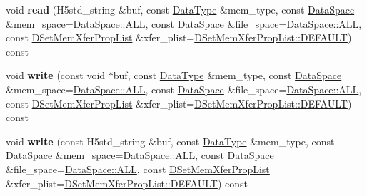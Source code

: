 \begin{DoxyCompactItemize}
\mbox{\label{class_h5_1_1_data_set_aedece6f602299ab2ebc9cbe1a905db42}} 
void {\bfseries read} (H5std\+\_\+string \&buf, const \hyperlink{class_h5_1_1_data_type}{Data\+Type} \&mem\+\_\+type, const \hyperlink{class_h5_1_1_data_space}{Data\+Space} \&mem\+\_\+space=\hyperlink{class_h5_1_1_data_space_ae8a22405edd631eb923a327d39462ff2}{Data\+Space\+::\+A\+LL}, const \hyperlink{class_h5_1_1_data_space}{Data\+Space} \&file\+\_\+space=\hyperlink{class_h5_1_1_data_space_ae8a22405edd631eb923a327d39462ff2}{Data\+Space\+::\+A\+LL}, const \hyperlink{class_h5_1_1_d_set_mem_xfer_prop_list}{D\+Set\+Mem\+Xfer\+Prop\+List} \&xfer\+\_\+plist=\hyperlink{class_h5_1_1_d_set_mem_xfer_prop_list_ae69bf0ec7bccd4bb793ffe1ff770d8c4}{D\+Set\+Mem\+Xfer\+Prop\+List\+::\+D\+E\+F\+A\+U\+LT}) const
\item 
\mbox{\label{class_h5_1_1_data_set_a0466e3d7c4828c6ff464e3ba93773262}} 
void {\bfseries write} (const void $\ast$buf, const \hyperlink{class_h5_1_1_data_type}{Data\+Type} \&mem\+\_\+type, const \hyperlink{class_h5_1_1_data_space}{Data\+Space} \&mem\+\_\+space=\hyperlink{class_h5_1_1_data_space_ae8a22405edd631eb923a327d39462ff2}{Data\+Space\+::\+A\+LL}, const \hyperlink{class_h5_1_1_data_space}{Data\+Space} \&file\+\_\+space=\hyperlink{class_h5_1_1_data_space_ae8a22405edd631eb923a327d39462ff2}{Data\+Space\+::\+A\+LL}, const \hyperlink{class_h5_1_1_d_set_mem_xfer_prop_list}{D\+Set\+Mem\+Xfer\+Prop\+List} \&xfer\+\_\+plist=\hyperlink{class_h5_1_1_d_set_mem_xfer_prop_list_ae69bf0ec7bccd4bb793ffe1ff770d8c4}{D\+Set\+Mem\+Xfer\+Prop\+List\+::\+D\+E\+F\+A\+U\+LT}) const
\item 
\mbox{\label{class_h5_1_1_data_set_aa324b3d2eb4db1c29a5533eee8787e7e}} 
void {\bfseries write} (const H5std\+\_\+string \&buf, const \hyperlink{class_h5_1_1_data_type}{Data\+Type} \&mem\+\_\+type, const \hyperlink{class_h5_1_1_data_space}{Data\+Space} \&mem\+\_\+space=\hyperlink{class_h5_1_1_data_space_ae8a22405edd631eb923a327d39462ff2}{Data\+Space\+::\+A\+LL}, const \hyperlink{class_h5_1_1_data_space}{Data\+Space} \&file\+\_\+space=\hyperlink{class_h5_1_1_data_space_ae8a22405edd631eb923a327d39462ff2}{Data\+Space\+::\+A\+LL}, const \hyperlink{class_h5_1_1_d_set_mem_xfer_prop_list}{D\+Set\+Mem\+Xfer\+Prop\+List} \&xfer\+\_\+plist=\hyperlink{class_h5_1_1_d_set_mem_xfer_prop_list_ae69bf0ec7bccd4bb793ffe1ff770d8c4}{D\+Set\+Mem\+Xfer\+Prop\+List\+::\+D\+E\+F\+A\+U\+LT}) const

\end{DoxyCompactItemize}
